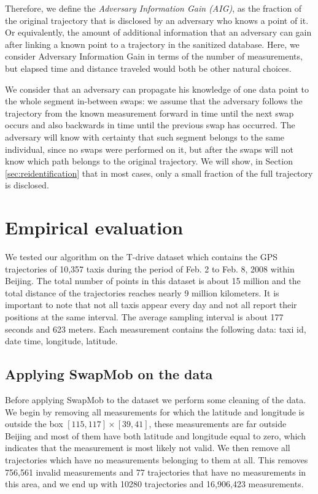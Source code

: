 Therefore, we define the \emph{Adversary Information Gain (AIG)}, as the fraction of the original trajectory that is disclosed by an adversary who knows a point of it. Or equivalently, the amount of additional information that an adversary can gain after linking a known point to a trajectory in the sanitized database.
Here, we consider Adversary Information Gain in terms of the number of measurements, but elapsed time and distance traveled would both be other natural choices.

We consider that an adversary can propagate his knowledge of one data point to the whole segment in-between swaps: we assume that the adversary follows the trajectory from the known measurement forward in time until the next swap occurs and also backwards in time until the previous swap has occurred. 
The adversary will know with certainty that such segment belongs to the same individual, since no swaps were performed on it, but after the swaps will not know which path belongs to the original trajectory.
We will show, in Section \ref{sec:reidentification}
that in most cases, only a small fraction of the full trajectory is disclosed.


\section{Empirical evaluation}\label{Sec:evaluation}
We tested our algorithm on the T-drive dataset
\citep{Yuan2010,Yuan2011} which contains the GPS trajectories of
10,357 taxis during the period of Feb. 2 to Feb. 8, 2008 within
Beijing. The total number of points in this dataset is about 15
million and the total distance of the trajectories reaches nearly 9
million kilometers. It is important to note that not all taxis appear
every day and not all report their positions at the same interval. The
average sampling interval is about 177 seconds and 623 meters. Each
measurement contains the following data: taxi id, date time,
longitude, latitude.

\subsection{Applying SwapMob on the data}
Before applying SwapMob to the dataset we perform some cleaning of the
data. We begin by removing all measurements for which the latitude and
longitude is outside the box $[115, 117] \times [39, 41]$, these
measurements are far outside Beijing and most of them have both
latitude and longitude equal to zero, which indicates that the
measurement is most likely not valid. We then remove all trajectories
which have no measurements belonging to them at all. This
removes 756,561 invalid measurements and 77 trajectories that have no
measurements in this area, and we end up with 10280 trajectories and 16,906,423
measurements.

